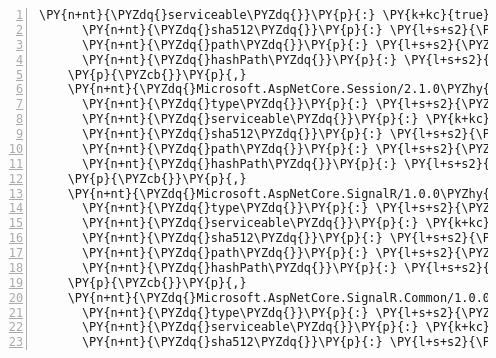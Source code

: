 \begin{Verbatim}[commandchars=\\\{\},numbers=left,firstnumber=1,stepnumber=1,numberblanklines=0]
      \PY{n+nt}{\PYZdq{}serviceable\PYZdq{}}\PY{p}{:} \PY{k+kc}{true}\PY{p}{,}
      \PY{n+nt}{\PYZdq{}sha512\PYZdq{}}\PY{p}{:} \PY{l+s+s2}{\PYZdq{}sha512\PYZhy{}ovi6XpqzQ+EBRxXxDo22dHWOmBJSMITpAbX8NrHjEg65Y6t1iCgWpal+NtVG/ePgeYoMJPdt9tBl2Y7LZR6exQ==\PYZdq{}}\PY{p}{,}
      \PY{n+nt}{\PYZdq{}path\PYZdq{}}\PY{p}{:} \PY{l+s+s2}{\PYZdq{}microsoft.aspnetcore.server.kestrel.transport.sockets/2.1.0\PYZhy{}rc1\PYZhy{}final\PYZdq{}}\PY{p}{,}
      \PY{n+nt}{\PYZdq{}hashPath\PYZdq{}}\PY{p}{:} \PY{l+s+s2}{\PYZdq{}microsoft.aspnetcore.server.kestrel.transport.sockets.2.1.0\PYZhy{}rc1\PYZhy{}final.nupkg.sha512\PYZdq{}}
    \PY{p}{\PYZcb{}}\PY{p}{,}
    \PY{n+nt}{\PYZdq{}Microsoft.AspNetCore.Session/2.1.0\PYZhy{}rc1\PYZhy{}final\PYZdq{}}\PY{p}{:} \PY{p}{\PYZob{}}
      \PY{n+nt}{\PYZdq{}type\PYZdq{}}\PY{p}{:} \PY{l+s+s2}{\PYZdq{}package\PYZdq{}}\PY{p}{,}
      \PY{n+nt}{\PYZdq{}serviceable\PYZdq{}}\PY{p}{:} \PY{k+kc}{true}\PY{p}{,}
      \PY{n+nt}{\PYZdq{}sha512\PYZdq{}}\PY{p}{:} \PY{l+s+s2}{\PYZdq{}sha512\PYZhy{}xNKsxX58iJbT5M4sXQamCz/lU1PTx//7uB79E0g754vMO6dolthPHGGZpDeSmeAfz+YjNV9QxLXZUjs3la52Yg==\PYZdq{}}\PY{p}{,}
      \PY{n+nt}{\PYZdq{}path\PYZdq{}}\PY{p}{:} \PY{l+s+s2}{\PYZdq{}microsoft.aspnetcore.session/2.1.0\PYZhy{}rc1\PYZhy{}final\PYZdq{}}\PY{p}{,}
      \PY{n+nt}{\PYZdq{}hashPath\PYZdq{}}\PY{p}{:} \PY{l+s+s2}{\PYZdq{}microsoft.aspnetcore.session.2.1.0\PYZhy{}rc1\PYZhy{}final.nupkg.sha512\PYZdq{}}
    \PY{p}{\PYZcb{}}\PY{p}{,}
    \PY{n+nt}{\PYZdq{}Microsoft.AspNetCore.SignalR/1.0.0\PYZhy{}rc1\PYZhy{}final\PYZdq{}}\PY{p}{:} \PY{p}{\PYZob{}}
      \PY{n+nt}{\PYZdq{}type\PYZdq{}}\PY{p}{:} \PY{l+s+s2}{\PYZdq{}package\PYZdq{}}\PY{p}{,}
      \PY{n+nt}{\PYZdq{}serviceable\PYZdq{}}\PY{p}{:} \PY{k+kc}{true}\PY{p}{,}
      \PY{n+nt}{\PYZdq{}sha512\PYZdq{}}\PY{p}{:} \PY{l+s+s2}{\PYZdq{}sha512\PYZhy{}7EWAZNyHEUF8pZ+MstFfO0XxSY6uTwOz7e16pgtPWRFwhjjhOSZSTQbmu3RO+N0oetXvUnEkL+735wO11ggCnQ==\PYZdq{}}\PY{p}{,}
      \PY{n+nt}{\PYZdq{}path\PYZdq{}}\PY{p}{:} \PY{l+s+s2}{\PYZdq{}microsoft.aspnetcore.signalr/1.0.0\PYZhy{}rc1\PYZhy{}final\PYZdq{}}\PY{p}{,}
      \PY{n+nt}{\PYZdq{}hashPath\PYZdq{}}\PY{p}{:} \PY{l+s+s2}{\PYZdq{}microsoft.aspnetcore.signalr.1.0.0\PYZhy{}rc1\PYZhy{}final.nupkg.sha512\PYZdq{}}
    \PY{p}{\PYZcb{}}\PY{p}{,}
    \PY{n+nt}{\PYZdq{}Microsoft.AspNetCore.SignalR.Common/1.0.0\PYZhy{}rc1\PYZhy{}final\PYZdq{}}\PY{p}{:} \PY{p}{\PYZob{}}
      \PY{n+nt}{\PYZdq{}type\PYZdq{}}\PY{p}{:} \PY{l+s+s2}{\PYZdq{}package\PYZdq{}}\PY{p}{,}
      \PY{n+nt}{\PYZdq{}serviceable\PYZdq{}}\PY{p}{:} \PY{k+kc}{true}\PY{p}{,}
      \PY{n+nt}{\PYZdq{}sha512\PYZdq{}}\PY{p}{:} \PY{l+s+s2}{\PYZdq{}sha512\PYZhy{}pDEm0sL9zv+AWliTawPP0frSJkMOTckgq0ShYlqVu+WI6MXs6ycBQTdahA3KMR4CE9SDgE/YxHzSRNP5vCQLKg==\PYZdq{}}\PY{p}{,}

\end{Verbatim}

